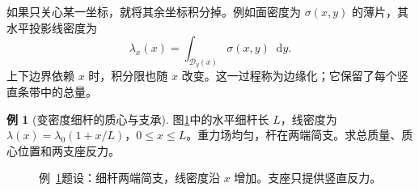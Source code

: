 \documentclass[11pt,openany,fontset=fandol]{ctexbook}
\theoremstyle{definition}\newtheorem{example}{例}[chapter]\newtheorem{exercise}{习题}[chapter]
\newcommand{\dd}{\mathop{}\!\mathrm d}\newcommand{\ee}{\mathrm e}\newcommand{\vct}[1]{\bm{#1}}
\begin{document}
如果只关心某一坐标，就将其余坐标积分掉。例如面密度为 $\sigma(x,y)$ 的薄片，其水平投影线密度为
\[
\lambda_x(x)=\int_{\mathcal D_y(x)}\sigma(x,y)\dd y.
\]
上下边界依赖 $x$ 时，积分限也随 $x$ 改变。这一过程称为边缘化；它保留了每个竖直条带中的总量。

\par\medskip\noindent\begin{minipage}{\textwidth}
\begin{example}[变密度细杆的质心与支承]\label{mp1:ex:e2}
图\ref{mp1:fig:e2-q}中的水平细杆长 $L$，线密度为 $\lambda(x)=\lambda_0(1+x/L)$，$0\le x\le L$。重力场均匀，杆在两端简支。求总质量、质心位置和两支座反力。
\end{example}

\begin{figure}[H]\centering

\caption{例~\ref{mp1:ex:e2}题设：细杆两端简支，线密度沿 $x$ 增加。支座只提供竖直反力。}\label{mp1:fig:e2-q}
\end{figure}

\end{minipage}\par\medskip
\end{document}

